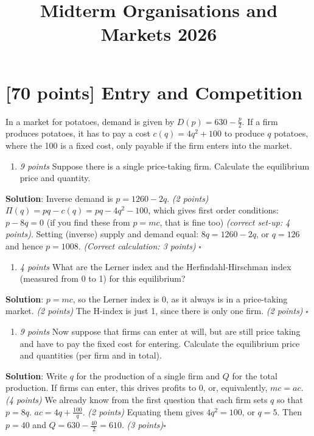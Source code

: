 \documentclass{article}
\title{Midterm Organisations and Markets 2026}
\author{}
\date{}
\begin{document}
\maketitle

\section{[70 points] Entry and Competition}
In a market for potatoes, demand is given by $D(p)=630-\frac p2$. If a firm produces potatoes, it has to pay a cost $c(q)=4q^{2}+100$ to produce $q$ potatoes, where the 100 is a fixed cost, only payable if the firm enters into the market.

\begin{enumerate}[label=(\alph*)]
\item \textit{9 points} Suppose there is a single price-taking firm. Calculate the equilibrium price and quantity. \end{enumerate}
\textbf{Solution}:
Inverse demand is $p=1260-2q$. \textit{(2 points)}
$\Pi(q)=pq-c(q)=pq-4q^{2}-100$, which gives first order conditions: $p-8q=0$ (if you find these from $p=mc$, that is fine too) \textit{(correct set-up: 4 points)}. Setting (inverse) supply and demand equal: $8q=1260-2q$, or $q=126$ and hence $p=1008$. \textit{(Correct calculation: 3 points)} $\square$

\begin{enumerate}[resume*]
\item \textit{4 points }What are the Lerner index and the Herfindahl-Hirschman index (measured from 0 to 1) for this equilibrium?\end{enumerate}
\textbf{Solution}:
$p=mc$, so the Lerner index is 0, as it always is in a price-taking market. \textit{(2 points)} The H-index is just 1, since there is only one firm. \textit{(2 points)} $\square$

\begin{enumerate}[resume*]
\item \textit{9 points }Now suppose that firms can enter at will, but are still price taking and have to pay the fixed cost for entering. Calculate the equilibrium price and quantities (per firm and in total).\end{enumerate}
\textbf{Solution}:
Write $q$ for the production of a single firm and $Q$ for the total production. If firms can enter, this drives profits to 0, or, equivalently, $mc=ac$. \textit{(4 points)} We already know from the first question that each firm sets $q$ so that $p=8q$. $ac=4q+\frac{100}q$. \textit{(2 points)} Equating them gives $4q^{2}=100$, or $q=5$. Then $p=40$ and $Q=630-\frac {40}2=610$. \textit{(3 points)}$\square$
\end{document}
